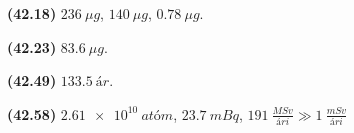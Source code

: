 \begin{tcolorbox}
\begin{enumerate*}[label = ]
  \item \textbf{(42.18)} $\SI{236}{\mu g}$, $\SI{140}{\mu g}$, $\SI{0.78}{\mu g}$.
  \item \textbf{(42.23)} $\SI{83.6}{\mu g}$.
  \item \textbf{(42.49)} $\SI{133.5}{ár}$.
  \item \textbf{(42.58)} $\SI{2.61e10}{atóm}$, $\SI{23.7}{mBq}$, $\SI{191}{\frac{MSv}{ári}} \gg \SI{1}{\frac{mSv}{ári}}$
\end{enumerate*}
\end{tcolorbox}

\newpage